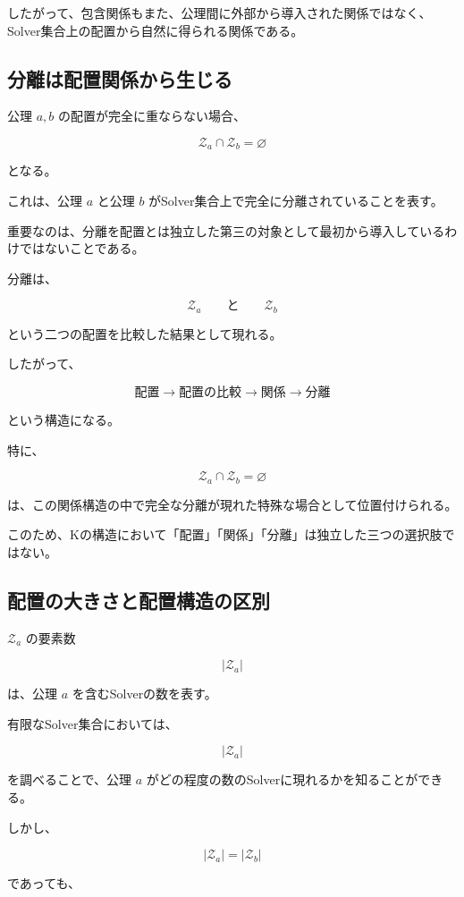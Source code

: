 したがって、包含関係もまた、公理間に外部から導入された関係ではなく、Solver集合上の配置から自然に得られる関係である。

\subsection{分離は配置関係から生じる}

公理 $a,b$ の配置が完全に重ならない場合、

\[
\boxed{
\mathcal{Z}_a\cap\mathcal{Z}_b=\varnothing
}
\]

となる。

これは、公理 $a$ と公理 $b$ がSolver集合上で完全に分離されていることを表す。

重要なのは、分離を配置とは独立した第三の対象として最初から導入しているわけではないことである。

分離は、

\[
\mathcal{Z}_a
\qquad\text{と}\qquad
\mathcal{Z}_b
\]

という二つの配置を比較した結果として現れる。

したがって、

\[
\boxed{
\text{配置}
\longrightarrow
\text{配置の比較}
\longrightarrow
\text{関係}
\longrightarrow
\text{分離}
}
\]

という構造になる。

特に、

\[
\mathcal{Z}_a\cap\mathcal{Z}_b=\varnothing
\]

は、この関係構造の中で完全な分離が現れた特殊な場合として位置付けられる。

このため、Kの構造において「配置」「関係」「分離」は独立した三つの選択肢ではない。

\subsection{配置の大きさと配置構造の区別}

$\mathcal{Z}_a$ の要素数

\[
|\mathcal{Z}_a|
\]

は、公理 $a$ を含むSolverの数を表す。

有限なSolver集合においては、

\[
|\mathcal{Z}_a|
\]

を調べることで、公理 $a$ がどの程度の数のSolverに現れるかを知ることができる。

しかし、

\[
|\mathcal{Z}_a| = |\mathcal{Z}_b|
\]

であっても、

